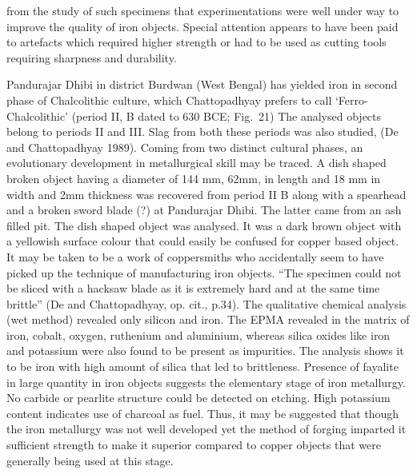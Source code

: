 from  the study of such specimens that experimentations were well under way to improve the quality of iron objects. Special attention appears to have been paid to artefacts which required higher strength or had to be used as cutting tools requiring sharpness and durability. 
 
Pandurajar Dhibi in district Burdwan (West Bengal) has yielded iron in second phase of Chalcolithic culture, which Chattopadhyay prefers to call ‘Ferro-Chalcolithic’ (period II, B dated to 630 BCE; Fig.~21)  The analysed objects belong to periods II and III. Slag from both these periods was also studied, (De and Chattopadhyay 1989). Coming from two distinct cultural phases, an evolutionary development in metallurgical skill may be traced. A dish shaped broken object having a diameter of 144 mm, 62mm, in length and 18 mm in width and 2mm thickness was recovered from period II B along with a spearhead and a broken sword blade (?) at Pandurajar Dhibi. The latter came from an ash filled pit. The dish shaped object was analysed. It was a dark brown object with a yellowish surface colour that could easily be confused for copper based object. It may be taken to be a work of coppersmiths who accidentally seem to have picked up the technique of manufacturing iron objects. “The specimen could not be sliced with a hacksaw blade as it is extremely hard and at the same time brittle” (De and Chattopadhyay, op. cit., p.34). The qualitative chemical analysis (wet method) revealed only silicon and iron. The EPMA revealed in the matrix of iron, cobalt, oxygen, ruthenium and aluminium, whereas silica oxides like iron and potassium were also found to be present as impurities. The analysis shows it to be iron with high amount of silica that led to brittleness. Presence of fayalite in large quantity in iron objects suggests the elementary stage of iron metallurgy. No carbide or pearlite structure could be detected on etching. High potassium content indicates use of charcoal as fuel. Thus, it may be suggested that though the iron metallurgy was not well developed yet the method of forging imparted it sufficient strength to make it superior compared to copper objects that were generally being used at this stage.



